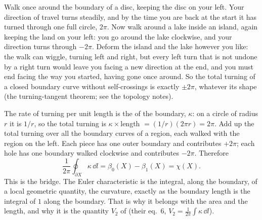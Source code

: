 Walk once around the boundary of a disc, keeping the disc on your left. Your direction of travel turns
steadily, and by the time you are back at the start it has turned through one full circle, $2\pi$. Now walk
around a lake inside an island, again keeping the land on your left: you go around the lake clockwise, and
your direction turns through $-2\pi$. Deform the island and the lake however you like: the walk can wiggle,
turning left and right, but every left turn that is not undone by a right turn would leave you facing a new
direction at the end, and you must end facing the way you started, having gone once around. So the total
turning of a closed boundary curve without self-crossings is exactly $\pm2\pi$, whatever its shape (the
turning-tangent theorem; see the topology notes).

The rate of turning per unit length is the  of the boundary, $\kappa$: on a circle of
radius $r$ it is $1/r$, so the total turning is $\kappa\times$length $=(1/r)(2\pi r)=2\pi$. Add up the total
turning over all the boundary curves of a region, each walked with the region on the left. Each piece has
one outer boundary and contributes $+2\pi$; each hole has one boundary walked clockwise and contributes
$-2\pi$. Therefore
\begin{equation}
  \frac{1}{2\pi}\oint_{\partial X}\kappa\,\dd l=\beta_0(X)-\beta_1(X)=\chi(X) .
  \label{12a:eq:chi-curv}
\end{equation}
This is the bridge. The Euler characteristic is the integral, along the boundary, of a local geometric
quantity, the curvature, exactly as the boundary length is the integral of $1$ along the boundary. That is
why it belongs with the area and the length, and why it is the quantity $V_2$ of
\cite{SchmalzingGorski1998} (their eq.~6, $V_2=\frac{1}{2\pi}\int\kappa\,\dd l$).

